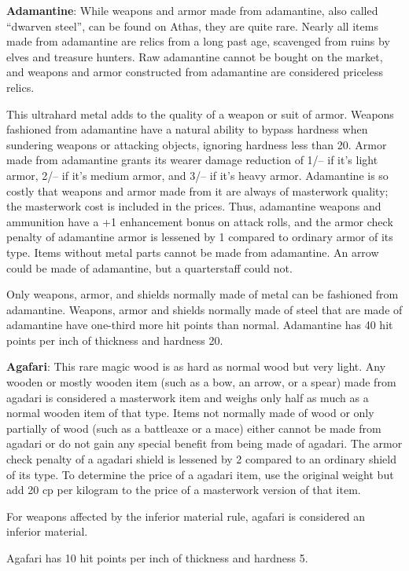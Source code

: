 \textbf{Adamantine}: While weapons and armor made from adamantine, also called ``dwarven steel'', can be found on Athas, they are quite rare. Nearly all items made from adamantine are relics from a long past age, scavenged from ruins by elves and treasure hunters. Raw adamantine cannot be bought on the market, and weapons and armor constructed from adamantine are considered priceless relics.

This ultrahard metal adds to the quality of a weapon or suit of armor. Weapons fashioned from adamantine have a natural ability to bypass hardness when sundering weapons or attacking objects, ignoring hardness less than 20. Armor made from adamantine grants its wearer damage reduction of 1/-- if it's light armor, 2/-- if it's medium armor, and 3/-- if it's heavy armor. Adamantine is so costly that weapons and armor made from it are always of masterwork quality; the masterwork cost is included in the prices. Thus, adamantine weapons and ammunition have a +1 enhancement bonus on attack rolls, and the armor check penalty of adamantine armor is lessened by 1 compared to ordinary armor of its type. Items without metal parts cannot be made from adamantine. An arrow could be made of adamantine, but a quarterstaff could not.

Only weapons, armor, and shields normally made of metal can be fashioned from adamantine. Weapons, armor and shields normally made of steel that are made of adamantine have one-third more hit points than normal. Adamantine has 40 hit points per inch of thickness and hardness 20.

\textbf{Agafari}: This rare magic wood is as hard as normal wood but very light. Any wooden or mostly wooden item (such as a bow, an arrow, or a spear) made from agadari is considered a masterwork item and weighs only half as much as a normal wooden item of that type. Items not normally made of wood or only partially of wood (such as a battleaxe or a mace) either cannot be made from agadari or do not gain any special benefit from being made of agadari. The armor check penalty of a agadari shield is lessened by 2 compared to an ordinary shield of its type. To determine the price of a agadari item, use the original weight but add 20 cp per kilogram to the price of a masterwork version of that item.

For weapons affected by the inferior material rule, agafari is considered an inferior material.

Agafari has 10 hit points per inch of thickness and hardness 5.

